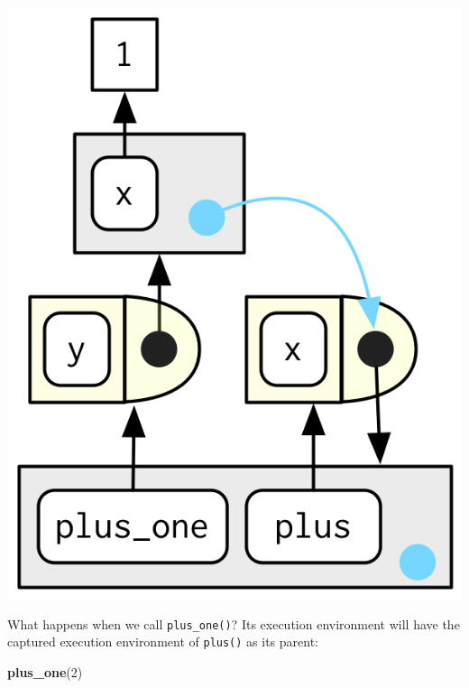 \documentclass[]{book}
\newenvironment{Shaded}{\begin{snugshade}}{\end{snugshade}}
\newcommand{\KeywordTok}[1]{\textcolor[rgb]{0.13,0.29,0.53}{\textbf{#1}}}
\newcommand{\DecValTok}[1]{\textcolor[rgb]{0.00,0.00,0.81}{#1}}
\newcommand{\NormalTok}[1]{#1}
\theoremstyle{definition}
\theoremstyle{definition}
\theoremstyle{definition}
\theoremstyle{remark}
\begin{document}
\begin{center}\includegraphics{diagrams/environments/closure} \end{center}

What happens when we call \texttt{plus\_one()}? Its execution
environment will have the captured execution environment of
\texttt{plus()} as its parent:

\begin{Shaded}
\begin{Highlighting}[]
\KeywordTok{plus_one}\NormalTok{(}\DecValTok{2}\NormalTok{)}
\end{Highlighting}
\end{Shaded}
\end{document}
